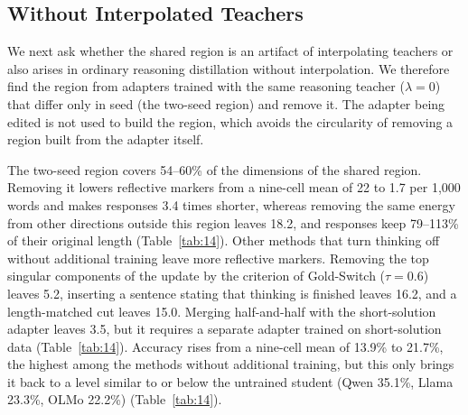 \begin{table}[t]
\centering
\small

\caption{Frequency of reflective markers (per 1,000 words) on GSM8K and GPQA-Diamond when the shared region is removed from the $\lambda=0$ adapter trained on MATH; the last two rows give the nine-cell mean token count and accuracy (\%). Other removed removes the same energy from other directions outside the shared region. Outside MATH as well, reflective markers vanish only when the shared region is removed. Values after $\pm$ are standard deviations across three seeds.}
\label{tab:12}
\end{table}

\begin{table}[t]
\centering
\small

\caption{GSM8K accuracy (\%) under the same conditions, and the share of responses that hit the generation limit. Removing the shared region almost eliminates truncation and raises accuracy to the level of the $\lambda=1$ adapter trained on short solutions. Values after $\pm$ are standard deviations across three seeds.}
\label{tab:13}
\end{table}

\subsection{Without Interpolated Teachers}\label{sec:noninterp}

We next ask whether the shared region is an artifact of interpolating teachers or also arises in ordinary reasoning distillation without interpolation. We therefore find the region from adapters trained with the same reasoning teacher ($\lambda=0$) that differ only in seed (the two-seed region) and remove it. The adapter being edited is not used to build the region, which avoids the circularity of removing a region built from the adapter itself.

The two-seed region covers 54--60\% of the dimensions of the shared region. Removing it lowers reflective markers from a nine-cell mean of 22 to 1.7 per 1,000 words and makes responses 3.4 times shorter, whereas removing the same energy from other directions outside this region leaves 18.2, and responses keep 79--113\% of their original length (Table~\ref{tab:14}).
Other methods that turn thinking off without additional training leave more reflective markers. Removing the top singular components of the update by the criterion of Gold-Switch ($\tau=0.6$) \citep{lee2025goldswitch} leaves 5.2, inserting a sentence stating that thinking is finished \citep{ma2025nothinking} leaves 16.2, and a length-matched cut \citep{muennighoff2025s1} leaves 15.0. Merging half-and-half with the short-solution adapter \citep{wu2025merging} leaves 3.5, but it requires a separate adapter trained on short-solution data (Table~\ref{tab:14}).
Accuracy rises from a nine-cell mean of 13.9\% to 21.7\%, the highest among the methods without additional training, but this only brings it back to a level similar to or below the untrained student (Qwen 35.1\%, Llama 23.3\%, OLMo 22.2\%) (Table~\ref{tab:14}).

